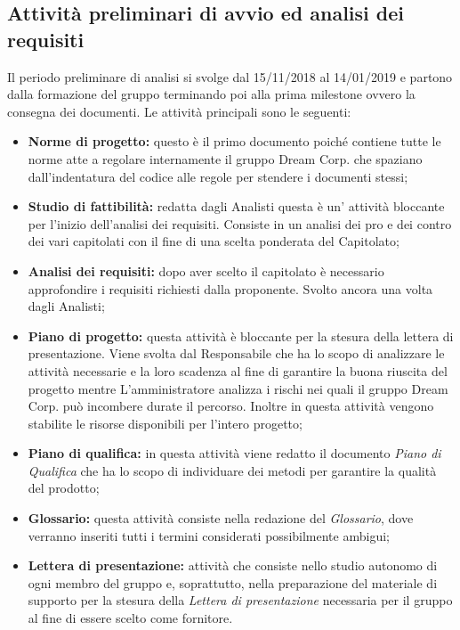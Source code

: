 \newpage
\subsection{Attività preliminari di avvio ed analisi dei requisiti}
Il periodo preliminare di analisi si svolge dal 15/11/2018 al 14/01/2019 e partono dalla formazione del gruppo terminando poi alla prima milestone ovvero la consegna dei documenti. \newline
Le attività principali sono le seguenti:
\begin{itemize}
	\item\textbf{Norme di progetto:} questo è il primo documento poiché contiene tutte le norme atte a regolare internamente il gruppo Dream Corp. che spaziano dall'indentatura del codice alle regole per stendere i documenti stessi;
	\item\textbf{Studio di fattibilità:} redatta dagli Analisti questa è un' attività bloccante per l'inizio dell'analisi dei requisiti. Consiste in un analisi dei pro e dei contro dei vari capitolati con il fine di una scelta ponderata del Capitolato\pedice;
	\item\textbf{Analisi dei requisiti:} dopo aver scelto il capitolato è necessario approfondire i requisiti richiesti dalla proponente. Svolto ancora una volta dagli Analisti;
	\item\textbf{Piano di progetto:} questa attività è bloccante per la stesura della lettera di presentazione. Viene svolta dal Responsabile che ha lo scopo di analizzare le attività necessarie e la loro scadenza al fine di garantire la  buona riuscita del progetto mentre L'amministratore analizza i rischi nei quali il gruppo Dream Corp. può incombere durate il percorso. Inoltre in questa attività vengono stabilite le risorse disponibili per l'intero progetto;
	\item\textbf{Piano di qualifica:} in questa attività viene redatto il documento \textit{Piano di Qualifica} che ha lo scopo di individuare dei metodi per garantire la qualità del prodotto;
	\item\textbf{Glossario:} questa attività consiste nella redazione del \textit{Glossario}, dove verranno inseriti tutti i termini considerati possibilmente ambigui;
	\item\textbf{Lettera di presentazione:} attività che consiste nello studio autonomo di ogni membro del gruppo e, soprattutto, nella preparazione del materiale di supporto per la stesura della \textit{Lettera di presentazione} necessaria per il gruppo al fine di essere scelto come fornitore.
\end{itemize}

